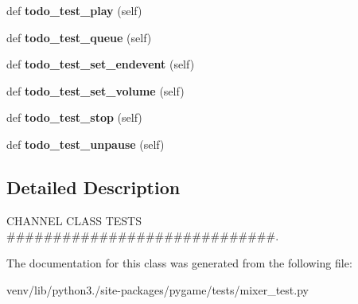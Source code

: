 \begin{DoxyCompactItemize}
\mbox{\label{classpygame_1_1tests_1_1mixer__test_1_1_channel_type_test_a15ed3ba7fc10fe67eb97446272d216c1}} 
def {\bfseries todo\+\_\+test\+\_\+play} (self)
\item 
\mbox{\label{classpygame_1_1tests_1_1mixer__test_1_1_channel_type_test_afbf75b32c469637e0cd4e364ab34646a}} 
def {\bfseries todo\+\_\+test\+\_\+queue} (self)
\item 
\mbox{\label{classpygame_1_1tests_1_1mixer__test_1_1_channel_type_test_aa4875fa5a50fb9d196f1d9692b922fff}} 
def {\bfseries todo\+\_\+test\+\_\+set\+\_\+endevent} (self)
\item 
\mbox{\label{classpygame_1_1tests_1_1mixer__test_1_1_channel_type_test_a3fec4b36da746d04bf45d86f27d9e149}} 
def {\bfseries todo\+\_\+test\+\_\+set\+\_\+volume} (self)
\item 
\mbox{\label{classpygame_1_1tests_1_1mixer__test_1_1_channel_type_test_a33f470f09ef07a2469ecab058e821184}} 
def {\bfseries todo\+\_\+test\+\_\+stop} (self)
\item 
\mbox{\label{classpygame_1_1tests_1_1mixer__test_1_1_channel_type_test_a9498246681c2cbdce8cc3a4575349a69}} 
def {\bfseries todo\+\_\+test\+\_\+unpause} (self)
\end{DoxyCompactItemize}


\subsection{Detailed Description}
C\+H\+A\+N\+N\+EL C\+L\+A\+SS T\+E\+S\+TS \#\#\#\#\#\#\#\#\#\#\#\#\#\#\#\#\#\#\#\#\#\#\#\#\#\#\#\#\#. 

The documentation for this class was generated from the following file\+:\begin{DoxyCompactItemize}
\item 
venv/lib/python3./site-\/packages/pygame/tests/mixer\+\_\+test.\+py\end{DoxyCompactItemize}
